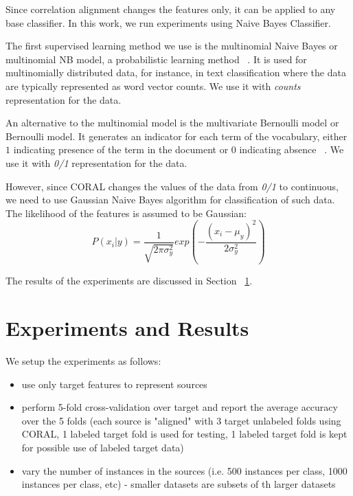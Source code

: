 Since correlation alignment changes the features only, it can be applied to any base classifier. In this work, we run experiments using Naive Bayes Classifier. 

The first supervised learning method we use is the multinomial Naive Bayes or multinomial NB model, a probabilistic learning method ~\citep{ir}. It is used for multinomially distributed data, for instance, in text classification where the data are typically represented as word vector counts. We use it with \textit{counts} representation for the data.

An alternative to the multinomial model is the multivariate Bernoulli model or Bernoulli model. It generates an indicator for each term of the vocabulary, either $1$ indicating presence of the term in the document or $0$ indicating absence ~\citep{ir}. We use it with \textit{0/1} representation for the data.

However, since CORAL changes the values of the data from \textit{0/1} to continuous, we need to use Gaussian Naive Bayes algorithm for classification of such data. The likelihood of the features is assumed to be Gaussian: \[ P(x_i|y) = \frac{1}{\sqrt{2\pi \sigma ^{2}_y}} exp\left ( - \frac{(x_i - \mu_y)^2}{2\sigma ^2_y} \right ) \] 

The results of the experiments are discussed in Section ~\ref{coralexperiments}.


\section{Experiments and Results}
\label{coralexperiments}

We setup the experiments as follows:

\begin{itemize}
  \item use only target features to represent sources
  \item perform 5-fold cross-validation over target and report the average accuracy over the 5 folds (each source is "aligned" with 3 target unlabeled folds using CORAL, 1 labeled target fold is used for testing, 1 labeled target fold is kept for possible use of labeled target data)
  \item vary the number of instances in the sources (i.e. 500 instances per class, 1000 instances per class, etc) - smaller datasets are subsets of th larger datasets
\end{itemize}


